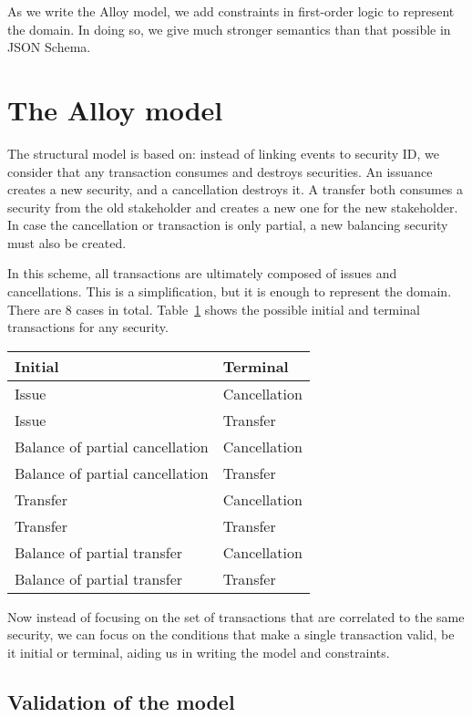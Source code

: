 \documentclass[12pt]{article}
\begin{document}
As we write the Alloy model, we add constraints in first-order logic to represent the domain. In doing so, we give much stronger semantics than that possible in JSON Schema.

\section{The Alloy model}

The structural model is based on: instead of linking events to security ID, we consider that any transaction consumes and destroys securities. An issuance creates a new security, and a cancellation destroys it. A transfer both consumes a security from the old stakeholder and creates a new one for the new stakeholder. In case the cancellation or transaction is only partial, a new balancing security must also be created.

In this scheme, all transactions are ultimately composed of issues and cancellations. This is a simplification, but it is enough to represent the domain. There are 8 cases in total. Table~\ref{tab:initial-terminal} shows the possible initial and terminal transactions for any security.

\begin{table}
\begin{tabularx}{\textwidth}{X X}
\toprule
\textbf{Initial} & \textbf{Terminal} \\
\midrule
Issue & Cancellation \\
Issue & Transfer \\
\midrule
Balance of partial cancellation & Cancellation \\
Balance of partial cancellation & Transfer \\
\midrule
Transfer & Cancellation \\
Transfer & Transfer \\
\midrule
Balance of partial transfer & Cancellation \\
Balance of partial transfer & Transfer \\
\bottomrule
\end{tabularx}
\label{tab:initial-terminal}
\end{table}

Now instead of focusing on the set of transactions that are correlated to the same security, we can focus on the conditions that make a single transaction valid, be it initial or terminal, aiding us in writing the model and constraints.

\subsection{Validation of the model}
\end{document}
